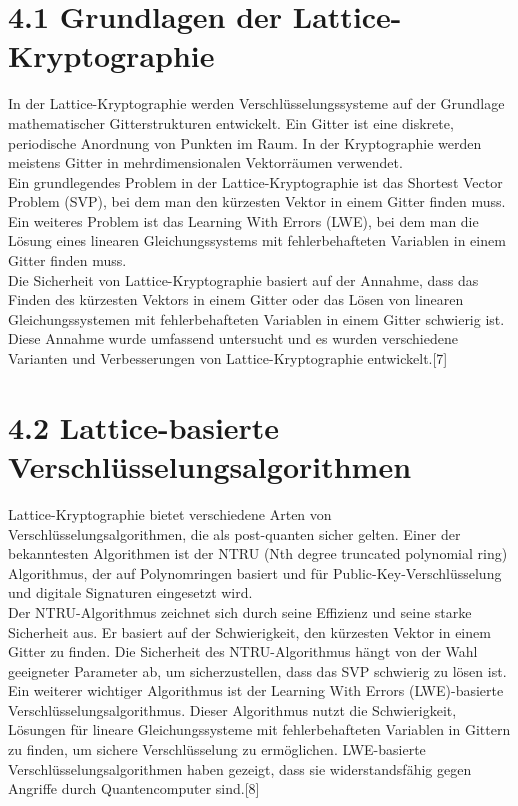 \section{4.1 Grundlagen der Lattice-Kryptographie}
In der Lattice-Kryptographie werden Verschlüsselungssysteme auf der Grundlage mathematischer Gitterstrukturen entwickelt. Ein Gitter ist eine diskrete, periodische Anordnung von Punkten im Raum. In der Kryptographie werden meistens Gitter in mehrdimensionalen Vektorräumen verwendet.
\\ Ein grundlegendes Problem in der Lattice-Kryptographie ist das Shortest Vector Problem (SVP), bei dem man den kürzesten Vektor in einem Gitter finden muss. Ein weiteres Problem ist das Learning With Errors (LWE), bei dem man die Lösung eines linearen Gleichungssystems mit fehlerbehafteten Variablen in einem Gitter finden muss.
\\ Die Sicherheit von Lattice-Kryptographie basiert auf der Annahme, dass das Finden des kürzesten Vektors in einem Gitter oder das Lösen von linearen Gleichungssystemen mit fehlerbehafteten Variablen in einem Gitter schwierig ist. Diese Annahme wurde umfassend untersucht und es wurden verschiedene Varianten und Verbesserungen von Lattice-Kryptographie entwickelt.[7]

\section{4.2 Lattice-basierte Verschlüsselungsalgorithmen}
Lattice-Kryptographie bietet verschiedene Arten von Verschlüsselungsalgorithmen, die als post-quanten sicher gelten. Einer der bekanntesten Algorithmen ist der NTRU (Nth degree truncated polynomial ring) Algorithmus, der auf Polynomringen basiert und für Public-Key-Verschlüsselung und digitale Signaturen eingesetzt wird.
\\ Der NTRU-Algorithmus zeichnet sich durch seine Effizienz und seine starke Sicherheit aus. Er basiert auf der Schwierigkeit, den kürzesten Vektor in einem Gitter zu finden. Die Sicherheit des NTRU-Algorithmus hängt von der Wahl geeigneter Parameter ab, um sicherzustellen, dass das SVP schwierig zu lösen ist.
\\ Ein weiterer wichtiger Algorithmus ist der Learning With Errors (LWE)-basierte Verschlüsselungsalgorithmus. Dieser Algorithmus nutzt die Schwierigkeit, Lösungen für lineare Gleichungssysteme mit fehlerbehafteten Variablen in Gittern zu finden, um sichere Verschlüsselung zu ermöglichen. LWE-basierte Verschlüsselungsalgorithmen haben gezeigt, dass sie widerstandsfähig gegen Angriffe durch Quantencomputer sind.[8]

